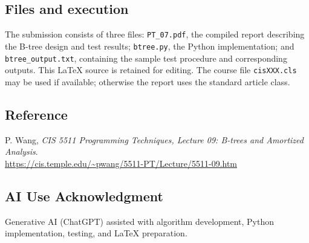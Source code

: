 \documentclass{cisXXX}
\begin{document}
\subsection*{Files and execution}
The submission consists of three files: \texttt{PT\_07.pdf}, the compiled
report describing the B-tree design and test results; \texttt{btree.py}, the
Python implementation; and \texttt{btree\_output.txt}, containing the sample
test procedure and corresponding outputs. This \LaTeX{} source is retained
for editing. The course file \texttt{cisXXX.cls} may be used if available;
otherwise the report uses the standard article class.

\subsection*{Reference}
P. Wang, \emph{CIS 5511 Programming Techniques, Lecture 09: B-trees and
Amortized Analysis}.\\
\url{https://cis.temple.edu/~pwang/5511-PT/Lecture/5511-09.htm}

\subsection*{AI Use Acknowledgment}
Generative AI (ChatGPT) assisted with algorithm development, Python
implementation, testing, and LaTeX preparation.
\end{document}
